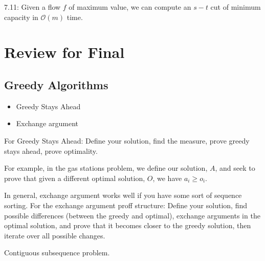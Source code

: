 \documentclass[11pt,letterpaper]{article}
\begin{document}
7.11: Given a flow $f$ of maximum value, we can compute an $s-t$ cut of minimum capacity in $\mathcal{O}(m)$ time. 


\section{Review for Final}
\subsection*{Greedy Algorithms}
\begin{itemize}
	\item Greedy Stays Ahead
	\item Exchange argument
\end{itemize}

For Greedy Stays Ahead: Define your solution, find the measure, prove greedy stays ahead, prove optimality.

For example, in the gas stations problem, we define our solution, $A$, and seek to prove that given a different optimal solution, $O$, we have $a_i \geq o_i$.

In general, exchange argument works well if you have some sort of sequence sorting. For the exchange argument proff structure: Define your solution, find possible differences (between the greedy and optimal), exchange arguments in the optimal solution, and prove that it becomes closer to the greedy solution, then iterate over all possible changes.

Contiguous subsequence problem. 
\end{document}
